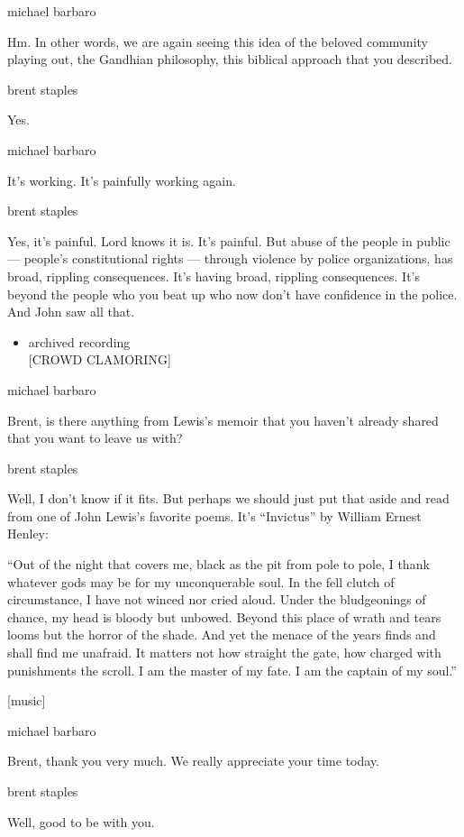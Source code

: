 michael barbaro

Hm. In other words, we are again seeing this idea of the beloved
community playing out, the Gandhian philosophy, this biblical approach
that you described.

brent staples

Yes.

michael barbaro

It's working. It's painfully working again.

brent staples

Yes, it's painful. Lord knows it is. It's painful. But abuse of the
people in public --- people's constitutional rights --- through violence
by police organizations, has broad, rippling consequences. It's having
broad, rippling consequences. It's beyond the people who you beat up who
now don't have confidence in the police. And John saw all that.

\begin{itemize}
\tightlist
\item
  archived recording\\
  {[}CROWD CLAMORING{]}
\end{itemize}

michael barbaro

Brent, is there anything from Lewis's memoir that you haven't already
shared that you want to leave us with?

brent staples

Well, I don't know if it fits. But perhaps we should just put that aside
and read from one of John Lewis's favorite poems. It's ``Invictus'' by
William Ernest Henley:

``Out of the night that covers me, black as the pit from pole to pole, I
thank whatever gods may be for my unconquerable soul. In the fell clutch
of circumstance, I have not winced nor cried aloud. Under the
bludgeonings of chance, my head is bloody but unbowed. Beyond this place
of wrath and tears looms but the horror of the shade. And yet the menace
of the years finds and shall find me unafraid. It matters not how
straight the gate, how charged with punishments the scroll. I am the
master of my fate. I am the captain of my soul.''

{[}music{]}

michael barbaro

Brent, thank you very much. We really appreciate your time today.

brent staples

Well, good to be with you.

